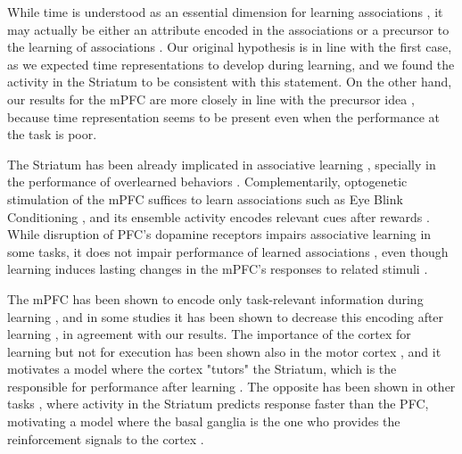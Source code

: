 While time is understood as an essential dimension for learning associations \cite{balsam2009temporal,kirkpatrick2016associative}, it may actually be either an attribute encoded in the associations \cite{molet2014timing} or a precursor to the learning of associations \cite{balsam2002timing}. Our original hypothesis is in line with the first case, as we expected time representations to develop during learning, and we found the activity in the Striatum to be consistent with this statement. On the other hand, our results for the mPFC are more closely in line with the precursor idea \cite{balsam2002timing}, because time representation seems to be present even when the performance at the task is poor. 

The Striatum has been already implicated in associative learning \cite{li2011differential,liljeholm2012contributions}, specially in the performance of overlearned behaviors \cite{smith2013dual}. Complementarily, optogenetic stimulation of the mPFC suffices to learn associations such as Eye Blink Conditioning \cite{wu2015optogenetic}, and its ensemble activity encodes relevant cues after rewards \cite{maggi2018ensemble}. While disruption of PFC's dopamine receptors impairs associative learning in some tasks, it does not impair performance of learned associations \cite{puig2012role, puig2014prefrontal}, even though learning induces lasting changes in the mPFC's responses to related stimuli \cite{takehara2008spontaneous}.

The mPFC has been shown to encode only task-relevant information during learning \cite{kaplan2017role}, and in some studies it has been shown to decrease this encoding after learning \cite{schuck2015medial}, in agreement with our results. The importance of the cortex for learning but not for execution has been shown also in the motor cortex \cite{kawai2015motor}, and it motivates a model where the cortex "tutors" the Striatum, which is the responsible for performance after learning \cite{murray2017learning}. The opposite has been shown in other tasks \cite{pasupathy2005different}, where activity in the Striatum predicts response faster than the PFC, motivating a model where the basal ganglia is the one who provides the reinforcement signals to the cortex \cite{helie2015learning}. 

